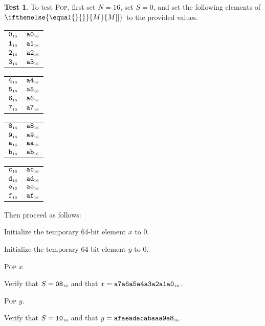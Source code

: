\documentclass[a4paper,12pt]{article}
\makeatletter
\newcommand{\num}[1]{\texttt{\MakeLowercase{#1}}}
\newcommand{\hex}[1]{\num{#1}_{\textup{\tiny 16}}}
\newcommand{\MEM}[1]{\ifthenelse{\equal{#1}{}}{M}{M[#1]}}
\newcommand{\SP}{S}
\newcommand{\proc}[1]{\textsc{#1}}
\theoremstyle{definition}
\newtheorem{test}{Test}
\newenvironment{memtable}{%
  \begin{trivlist}
    \item
    }{%
    \end{trivlist}}
\newenvironment{memcolumn}{%
  \begin{tabular}{@{}ll@{}}
    \hline}
    {%
    \hline
  \end{tabular}}
\newcommand{\memspace}{\qquad}
\makeatother
\begin{document}
\begin{test}
  To test \proc{Pop}, first set $N=16$, set $S=0$, and set the following elements of $\MEM{}$ to the provided values.
  \begin{memtable}
    \begin{memcolumn}
      $\hex{0}$ & $\hex{A0}$ \\
      $\hex{1}$ & $\hex{A1}$ \\
      $\hex{2}$ & $\hex{A2}$ \\
      $\hex{3}$ & $\hex{A3}$ \\
    \end{memcolumn}
    \memspace
    \begin{memcolumn}
      $\hex{4}$ & $\hex{A4}$ \\
      $\hex{5}$ & $\hex{A5}$ \\
      $\hex{6}$ & $\hex{A6}$ \\
      $\hex{7}$ & $\hex{A7}$ \\
    \end{memcolumn}
    \memspace
    \begin{memcolumn}
      $\hex{8}$ & $\hex{A8}$ \\
      $\hex{9}$ & $\hex{A9}$ \\
      $\hex{A}$ & $\hex{AA}$ \\
      $\hex{B}$ & $\hex{AB}$ \\
    \end{memcolumn}
    \memspace
    \begin{memcolumn}
      $\hex{C}$ & $\hex{AC}$ \\
      $\hex{D}$ & $\hex{AD}$ \\
      $\hex{E}$ & $\hex{AE}$ \\
      $\hex{F}$ & $\hex{AF}$ \\
    \end{memcolumn}
  \end{memtable}
  Then proceed as follows:
  \begin{stepnumbers}
  \item Initialize the temporary 64-bit element $x$ to $0$.
  \item Initialize the temporary 64-bit element $y$ to $0$.
  \item \proc{Pop} $x$.
  \item Verify that $\SP = \hex{08}$ and that $x = \hex{A7A6A5A4A3A2A1A0}$.
  \item \proc{Pop} $y$.
  \item Verify that $\SP = \hex{10}$ and that $y = \hex{AFAEADACABAAA9A8}$.
  \end{stepnumbers}
\end{test}
\end{document}

